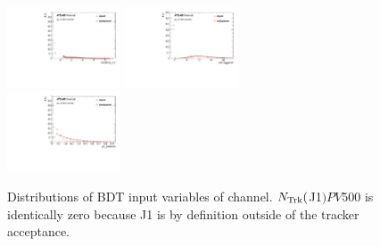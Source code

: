 \begin{figure}[htbp]
 \includegraphics[width=0.3\textwidth]{figures/VBF/BDT_mindRJ2_2cen.pdf}
 \includegraphics[width=0.3\textwidth]{figures/VBF/BDT_NTrk500_J2_2cen.pdf}\\
 \includegraphics[width=0.3\textwidth]{figures/VBF/BDT_pTBalance_2cen.pdf}\\

\caption{Distributions of BDT input variables of \twocentral channel.  $N_{\rm Trk}($J1$)PV500$ is identically zero because J1 is by definition outside of the tracker acceptance.}
  \label{fig:vbf-BDTInputs2cen}
\end{figure}

